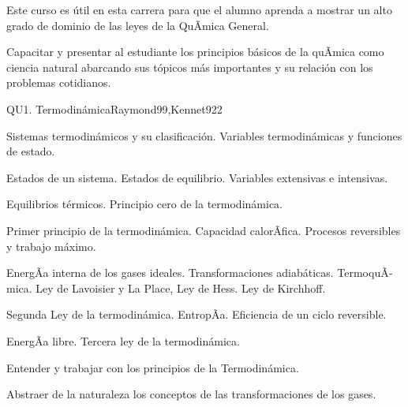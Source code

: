 \begin{syllabus}


\begin{justification}
Este curso es útil en esta carrera para que el alumno aprenda a mostrar un alto grado de dominio de las leyes de la QuÃ­mica General.
\end{justification}

\begin{goals}
\item Capacitar y presentar al estudiante los principios básicos de la quÃ­mica como ciencia natural abarcando sus tópicos más importantes y su relación con los problemas cotidianos.
\end{goals}

\begin{outcomes}
\end{outcomes}

\begin{unit}{QU1. Termodinámica}{Raymond99,Kennet92}{2}
\begin{topics}
      \item Sistemas termodinámicos y su clasificación. Variables termodinámicas y funciones de estado.
      \item Estados de un sistema. Estados de equilibrio. Variables extensivas e intensivas.
      \item Equilibrios térmicos. Principio cero de la termodinámica.
      \item Primer principio de la termodinámica. Capacidad calorÃ­fica. Procesos reversibles y trabajo máximo.
      \item EnergÃ­a interna de los gases ideales. Transformaciones adiabáticas. TermoquÃ­mica. Ley de Lavoisier y La Place, Ley de Hess. Ley de Kirchhoff.
      \item Segunda Ley de la termodinámica. EntropÃ­a. Eficiencia de un ciclo reversible.
	\item EnergÃ­a libre. Tercera ley de la termodinámica.
   \end{topics}

   \begin{unitgoals}
      \item Entender y trabajar con los principios de la Termodinámica.
      \item Abstraer de la naturaleza los conceptos de las transformaciones de los gases.
   \end{unitgoals}
\end{unit}


\end{syllabus}
